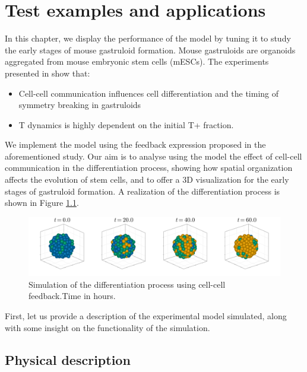 \chapter{Test examples and applications}\label{ch:4-applications}

In this chapter, we display the performance of the model by tuning it to study the early stages of mouse gastruloid formation. Mouse gastruloids are organoids aggregated from mouse embryonic stem cells (mESCs). The experiments presented in \cite{Oriola_2025} show that:
\begin{itemize}
    \item Cell-cell communication influences cell differentiation and the timing of symmetry breaking in gastruloids
    \item T dynamics is highly dependent on the initial T+ fraction.
\end{itemize}
We implement the model using the feedback expression proposed in the aforementioned study. Our aim is to analyse using the model the effect of cell-cell communication in the differentiation process, showing how spatial organization affects the evolution of stem cells, and to offer a 3D visualization for the early stages of gastruloid formation. A realization of the differentiation process is shown in Figure \ref{fig:aggregate-diff}.

\begin{figure}[h]
    \centering
    \includegraphics[width=\textwidth]{figures/400/400-aggregate-differentiation.png}
    \caption{Simulation of the differentiation process using cell-cell feedback.\linebreak Time in hours.}
    \label{fig:aggregate-diff}
\end{figure}

First, let us provide a description of the experimental model simulated, along with some insight on the functionality of the simulation.



\section{Physical description}

